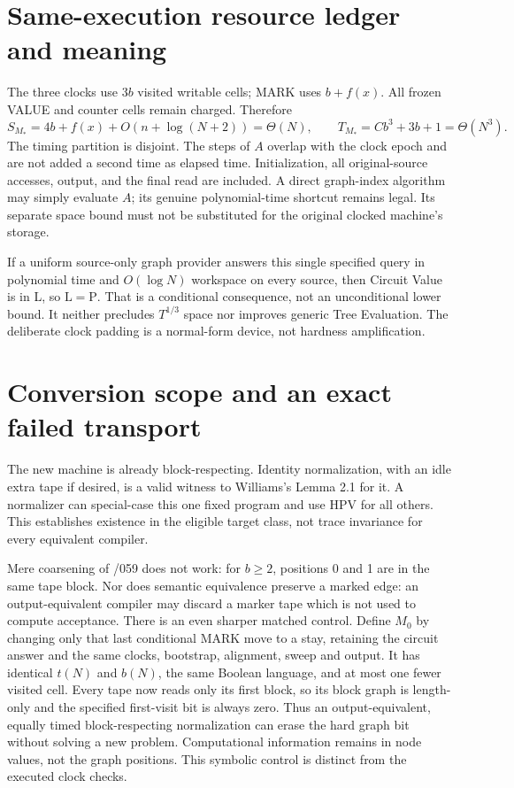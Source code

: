 \documentclass[11pt]{article}
\begin{document}
\section{Same-execution resource ledger and meaning}
The three clocks use $3b$ visited writable cells; MARK uses $b+f(x)$.
All frozen VALUE and counter cells remain charged. Therefore
\[
S_{M_*}=4b+f(x)+O(n+\log(N+2))=\Theta(N),\qquad
T_{M_*}=Cb^3+3b+1=\Theta(N^3).
\]
The timing partition is disjoint. The steps of $A$ overlap with the
clock epoch and are not added a second time as elapsed time. Initialization,
all original-source accesses, output, and the final read are included.
A direct graph-index algorithm may simply evaluate $A$; its genuine
polynomial-time shortcut remains legal. Its separate space bound must
not be substituted for the original clocked machine's storage.

If a uniform source-only graph provider answers this single specified
query in polynomial time and $O(\log N)$ workspace on every source, then
Circuit Value is in L, so $\mathrm L=\mathrm P$. That is a conditional
consequence, not an unconditional lower bound. It neither precludes
$T^{1/3}$ space nor improves generic Tree Evaluation. The deliberate
clock padding is a normal-form device, not hardness amplification.

\section{Conversion scope and an exact failed transport}
The new machine is already block-respecting. Identity normalization,
with an idle extra tape if desired, is a valid witness to Williams's
Lemma 2.1 for it. A normalizer can special-case this one fixed program
and use HPV for all others. This establishes existence in the eligible
target class, not trace invariance for every equivalent compiler.

Mere coarsening of /059 does not work: for $b\geq2$, positions 0 and 1
are in the same tape block. Nor does semantic equivalence preserve a
marked edge: an output-equivalent compiler may discard a marker tape
which is not used to compute acceptance. There is an even sharper matched control. Define $M_0$ by changing only
that last conditional MARK move to a stay, retaining the circuit answer
and the same clocks, bootstrap, alignment, sweep and output. It has
identical $t(N)$ and $b(N)$, the same Boolean language, and at most one
fewer visited cell. Every tape now reads only its first block, so its
block graph is length-only and the specified first-visit bit is always
zero. Thus an output-equivalent, equally timed block-respecting
normalization can erase the hard graph bit without solving a new
problem. Computational information remains in node values, not the
graph positions. This symbolic control is distinct from the executed
clock checks.
\end{document}
